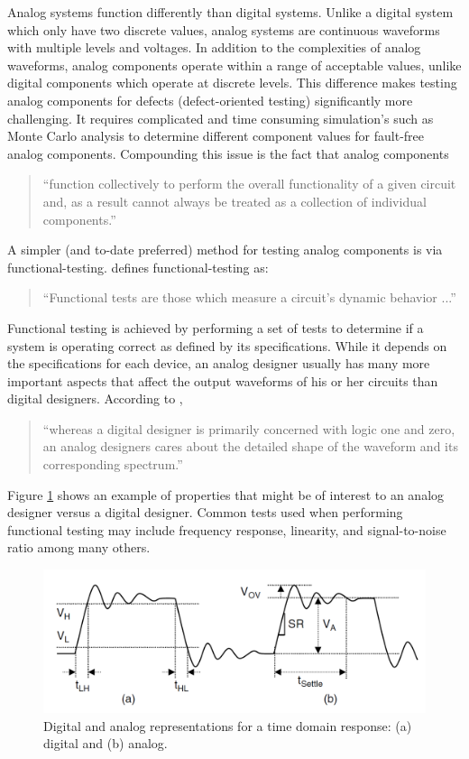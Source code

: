 \documentclass[12pt]{report}
\begin{document}
Analog systems function differently than digital systems.  Unlike a digital system which only have two discrete values, analog systems are continuous waveforms with multiple levels and voltages.  In addition to the complexities of analog waveforms, analog components operate within a range of acceptable values, unlike digital components which operate at discrete levels\cite{syschip}.  This difference makes testing analog components for defects (defect-oriented testing) significantly more challenging.  It requires complicated and time consuming simulation's such as Monte Carlo analysis to determine different component values for fault-free analog components\cite{syschip}.  Compounding this issue is the fact that analog components
\begin{quote}
``function collectively to perform the overall functionality of a given circuit and, as a result cannot always be treated as a collection of individual components\cite{syschip}.''
\end{quote}
A simpler (and to-date preferred) method for testing analog components is via functional-testing. \cite{milor} defines functional-testing as: 
\begin{quote}
``Functional tests are those which measure a circuit's dynamic behavior ...\cite{milor}''
\end{quote}
Functional testing is achieved by performing a set of tests to determine if a system is operating correct as defined by its specifications.  While it depends on the specifications for each device, an analog designer usually has many more important aspects that affect the output waveforms of his or her circuits than digital designers.  According to \cite{syschip},
\begin{quote}
``whereas a digital designer is primarily concerned with logic one and zero, an analog designers cares about the detailed shape of the waveform and its corresponding spectrum.\cite{syschip}''
\end{quote}
Figure \ref{fig:analogwave} shows an example of properties that might be of interest to an analog designer versus a digital designer.  Common tests used when performing functional testing may include frequency response, linearity, and signal-to-noise ratio among many others\cite{syschip}.

\begin{figure}
	\begin{center}
		\includegraphics[scale=.4]{images/analog-waveform}
	\end{center}
	\caption{Digital and analog representations for a time domain response: (a) digital and (b) analog.\cite{syschip}}
	\label{fig:analogwave}
\end{figure}
\end{document}
